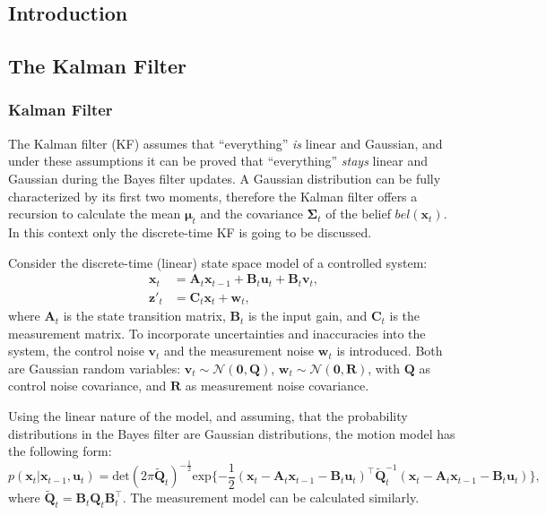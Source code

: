 \subsection{Introduction}
\subsection{The Kalman Filter}
\subsubsection{Kalman Filter}
The Kalman filter (KF) assumes that ``everything'' \emph{is} linear and Gaussian,
and under these assumptions it can be proved that ``everything'' \emph{stays} linear and Gaussian during the Bayes filter updates.
A Gaussian distribution can be fully characterized by its first two moments,
therefore the Kalman filter offers a recursion to calculate the mean $\boldsymbol{\mu}_t$ and the covariance $\mathbf{\Sigma}_t$ of the belief $bel(\mathbf{x}_t)$.
In this context only the discrete-time KF is going to be discussed.

Consider the discrete-time (linear) state space model of a controlled system:
\begin{align}
    \mathbf{x}_t  & = \mathbf{A}_t\mathbf{x}_{t-1} + \mathbf{B}_t\mathbf{u}_t + \mathbf{B}_t\mathbf{v}_t, \\
    \mathbf{z}'_t & = \mathbf{C}_t\mathbf{x}_t + \mathbf{w}_t, \label{eq:lin-meas-model}
\end{align}
where $\mathbf{A}_t$ is the state transition matrix, $\mathbf{B}_t$ is the input gain, and $\mathbf{C}_t$ is the measurement matrix. To incorporate uncertainties and inaccuracies into the system,
the control noise $\mathbf{v}_t$ and the measurement noise $\mathbf{w}_t$ is introduced.
Both are Gaussian random variables:
$\mathbf{v}_t \sim \mathcal{N}(\mathbf{0},\mathbf{Q})$, $\mathbf{w}_t \sim \mathcal{N}(\mathbf{0},\mathbf{R})$,
with $\mathbf{Q}$ as control noise covariance, and $\mathbf{R}$ as measurement noise covariance.

Using the linear nature of the model, and assuming, that the probability distributions in the Bayes filter are Gaussian distributions, the motion model has the following form:
\begin{equation}\label{key}
    p(\mathbf{x}_t|\mathbf{x}_{t-1}, \mathbf{u}_t) = \mathrm{det}(2\pi\tilde{\mathbf{Q}}_t)
    ^{-\frac{1}{2}}\mathrm{exp}\{-\frac{1}{2}(\mathbf{x}_t-\mathbf{A}_t\mathbf{x}_{t-1}-
    \mathbf{B}_t\mathbf{u}_t)^\top\tilde{\mathbf{Q}}_t^{-1}(\mathbf{x}_t-\mathbf{A}_t\mathbf{x}_{t-1}-\mathbf{B}_t\mathbf{u}_t)\},
\end{equation}
where $\tilde{\mathbf{Q}}_t = \mathbf{B}_t\mathbf{Q}_t\mathbf{B}_t^{\top}$.
The measurement model can be calculated similarly.

